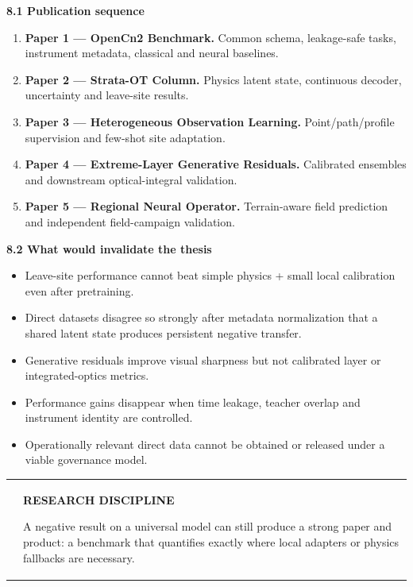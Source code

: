 \documentclass[
]{article}
\begin{document}
\textbf{8.1 Publication sequence}

\begin{enumerate}
\def\labelenumi{\arabic{enumi}.}
\item
  \textbf{Paper 1 --- OpenCn2 Benchmark.} Common schema, leakage-safe
  tasks, instrument metadata, classical and neural baselines.
\item
  \textbf{Paper 2 --- Strata-OT Column.} Physics latent state,
  continuous decoder, uncertainty and leave-site results.
\item
  \textbf{Paper 3 --- Heterogeneous Observation Learning.}
  Point/path/profile supervision and few-shot site adaptation.
\item
  \textbf{Paper 4 --- Extreme-Layer Generative Residuals.} Calibrated
  ensembles and downstream optical-integral validation.
\item
  \textbf{Paper 5 --- Regional Neural Operator.} Terrain-aware field
  prediction and independent field-campaign validation.
\end{enumerate}

\textbf{8.2 What would invalidate the thesis}

\begin{itemize}
\item
  Leave-site performance cannot beat simple physics + small local
  calibration even after pretraining.
\item
  Direct datasets disagree so strongly after metadata normalization that
  a shared latent state produces persistent negative transfer.
\item
  Generative residuals improve visual sharpness but not calibrated layer
  or integrated-optics metrics.
\item
  Performance gains disappear when time leakage, teacher overlap and
  instrument identity are controlled.
\item
  Operationally relevant direct data cannot be obtained or released
  under a viable governance model.
\end{itemize}

\begin{longtable}[]{@{}
  >{\raggedright\arraybackslash}p{}
  >{\raggedright\arraybackslash}p{}@{}}
\toprule\noalign{}
\endhead
\bottomrule\noalign{}
\endlastfoot
& \textbf{RESEARCH DISCIPLINE}

A negative result on a universal model can still produce a strong paper
and product: a benchmark that quantifies exactly where local adapters or
physics fallbacks are necessary. \\
\end{longtable}
\end{document}
